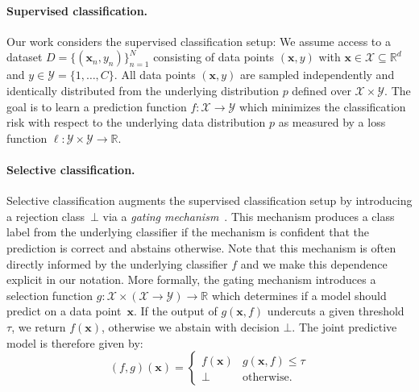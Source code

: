 
\paragraph{Supervised classification.} Our work considers the supervised classification setup: We assume access to a dataset $D = \{(\bm{x}_n,y_n)\}_{n=1}^{N}$ consisting of data points $(\bm{x},y)$ with $\bm{x} \in \mathcal{X} \subseteq \mathbb{R}^d$ and $y \in \mathcal{Y} = \{1, \ldots, C\}$. All data points $(\bm{x},y)$ are sampled independently and identically distributed from the underlying distribution $p$ defined over $\mathcal{X} \times \mathcal{Y}$. The goal is to learn a prediction function $f : \mathcal{X} \rightarrow \mathcal{Y}$ which minimizes the classification risk with respect to the underlying data distribution $p$ as measured by a loss function $\ell : \mathcal{Y} \times \mathcal{Y} \rightarrow \mathbb{R}$. 

\paragraph{Selective classification.} Selective classification augments the supervised classification setup by introducing a rejection class~$\bot$ via a \textit{gating mechanism}~\citep{yaniv2010riskcoveragecurve}. This mechanism produces a class label from the underlying classifier if the mechanism is confident that the prediction is correct and abstains otherwise. Note that this mechanism is often directly informed by the underlying classifier $f$ and we make this dependence explicit in our notation. More formally, the gating mechanism introduces a selection function $g:\mathcal{X} \times (\mathcal{X} \rightarrow \mathcal{Y}) \rightarrow \mathbb{R}$ which determines if a model should predict on a data point~$\bm{x}$. If the output of $g(\bm{x}, f)$ undercuts a given threshold $\tau$, we return $f(\bm{x})$, otherwise we abstain with decision $\bot$. The joint predictive model is therefore given by:
\begin{equation}
    (f,g)(\bm{x}) = \begin{cases}
  f(\bm{x})  & g(\bm{x}, f) \leq \tau \\
  \bot & \text{otherwise.}
\end{cases}
\end{equation}
